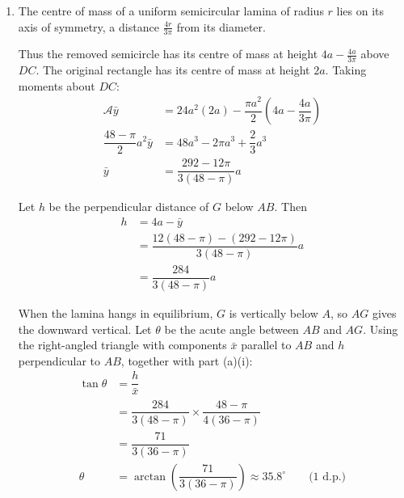 \documentclass[leqno]{article}
\begin{document}
\begin{enumerate}[
  label=\textbf{\arabic*.},
  leftmargin=*,
  topsep=0pt,
  partopsep=0pt,
  parsep=0pt
]
\begin{djsSolution}
\begin{enumerate}[label=\textbf{(\alph*)}, start=1]
\begin{enumerate}[label=(\roman*), start=1]
where \(\mathcal{A}=\sum\mathcal{A}_i\), with the area of a removed piece counted as negative.

Taking moments about \(AD\):
\begin{align*}
\mathcal{A}\bar{x}&=24a^2(3a)-\dfrac{\pi a^2}{2}(4a)\\
\dfrac{48-\pi}{2}a^2\bar{x}&=(72-2\pi)a^3\\
\bar{x}&=\dfrac{4(36-\pi)}{48-\pi}a
\end{align*}

\item The centre of mass of a uniform semicircular lamina of radius \(r\) lies on its axis of symmetry, a distance \(\frac{4r}{3\pi}\) from its diameter.

Thus the removed semicircle has its centre of mass at height \(4a-\frac{4a}{3\pi}\) above \(DC\). The original rectangle has its centre of mass at height \(2a\). Taking moments about \(DC\):
\begin{align*}
\mathcal{A}\bar{y}&=24a^2(2a)-\dfrac{\pi a^2}{2}\left(4a-\dfrac{4a}{3\pi}\right)\\
\dfrac{48-\pi}{2}a^2\bar{y}&=48a^3-2\pi a^3+\dfrac23a^3\\
\bar{y}&=\dfrac{292-12\pi}{3(48-\pi)}a
\end{align*}

Let \(h\) be the perpendicular distance of \(G\) below \(AB\). Then
\begin{align*}
h&=4a-\bar{y}\\
&=\dfrac{12(48-\pi)-(292-12\pi)}{3(48-\pi)}a\\
&=\dfrac{284}{3(48-\pi)}a
\end{align*}

When the lamina hangs in equilibrium, \(G\) is vertically below \(A\), so \(AG\) gives the downward vertical. Let \(\theta\) be the acute angle between \(AB\) and \(AG\). Using the right-angled triangle with components \(\bar{x}\) parallel to \(AB\) and \(h\) perpendicular to \(AB\), together with part (a)(i):
\begin{align*}
\tan\theta&=\dfrac{h}{\bar{x}}\\
&=\dfrac{284}{3(48-\pi)}\times\dfrac{48-\pi}{4(36-\pi)}\\
&=\dfrac{71}{3(36-\pi)}\\
\theta&=\arctan\left(\dfrac{71}{3(36-\pi)}\right)\approx35.8^\circ\qquad\text{(1 d.p.)}
\end{align*}

\end{enumerate}
\end{enumerate}
\end{djsSolution}


\end{enumerate}
\end{document}
